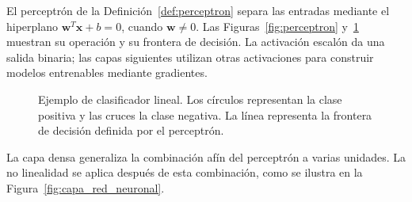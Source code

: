 El perceptrón de la Definición~\ref{def:perceptron} separa las entradas mediante el hiperplano $\mathbf w^T\mathbf x+b=0$, cuando $\mathbf w\neq0$. Las Figuras~\ref{fig:perceptron} y~\ref{fig:clasificador_lineal} muestran su operación y su frontera de decisión. La activación escalón da una salida binaria; las capas siguientes utilizan otras activaciones para construir modelos entrenables mediante gradientes.

\begin{figure}[H]
    \centering
    \caption{Ejemplo de clasificador lineal. Los círculos representan la clase positiva y las cruces la clase negativa. La línea representa la frontera de decisión definida por el perceptrón.}
    \label{fig:clasificador_lineal}
\end{figure}

La capa densa generaliza la combinación afín del perceptrón a varias unidades. La no linealidad se aplica después de esta combinación, como se ilustra en la Figura~\ref{fig:capa_red_neuronal}.

